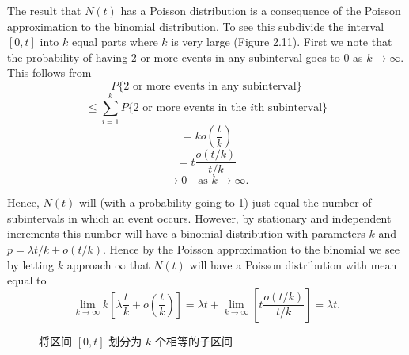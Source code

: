 \documentclass[lang=cn,10pt]{elegantbook}
\begin{document}
\begin{remark}

	The result that $N(t)$ has a Poisson distribution is a consequence of the Poisson approximation to the binomial distribution. To see this subdivide the interval $[0, t]$ into $k$ equal parts where $k$ is very large (Figure 2.11). First we note that the probability of having 2 or more events in any subinterval goes to 0 as $k \to \infty$. This follows from
\[
P\{2 \text{ or more events in any subinterval}\}
\]
\[
\leq \sum_{i=1}^{k} P\{2 \text{ or more events in the } i\text{th subinterval}\}
\]
\[
= k o\left(\frac{t}{k}\right)
\]
\[
= t \frac{o(t/k)}{t/k}
\]
\[
\to 0 \quad \text{as } k \to \infty.
\]
\end{remark}
Hence, $N(t)$ will (with a probability going to 1) just equal the number of subintervals in which an event occurs. However, by stationary and independent increments this number will have a binomial distribution with parameters $k$ and $p = \lambda t/k + o(t/k)$. Hence by the Poisson approximation to the binomial we see by letting $k$ approach $\infty$ that $N(t)$ will have a Poisson distribution with mean equal to
\[
\lim_{k \to \infty} k \left[ \lambda \frac{t}{k} + o\left(\frac{t}{k}\right) \right] = \lambda t + \lim_{k \to \infty} \left[ t \frac{o(t/k)}{t/k} \right] = \lambda t.
\]
\begin{figure}[h]
\centering
{}
\caption{将区间 \([0, t]\) 划分为 \(k\) 个相等的子区间}
\end{figure}
\end{document}
